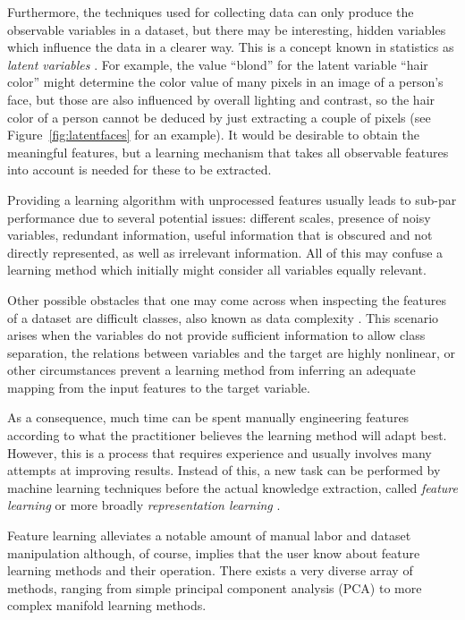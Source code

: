 Furthermore, the techniques used for collecting data can only produce the observable variables in a dataset, but there may be interesting, hidden variables which influence the data in a clearer way. This is a concept known in statistics as \textit{latent variables} . For example, the value  ``blond'' for the latent variable ``hair color'' might determine the color value of many pixels in an image of a person's face, but those are also influenced by overall lighting and contrast, so the hair color of a person cannot be deduced by just extracting a couple of pixels (see Figure~\ref{fig:latentfaces} for an example). It would be desirable to obtain the meaningful features, but a learning mechanism that takes all observable features into account is needed for these to be extracted.

Providing a learning algorithm with unprocessed features usually leads to sub-par performance due to several potential issues: different scales, presence of noisy variables, redundant information, useful information that is obscured and not directly represented, as well as irrelevant information. All of this may confuse a learning method which initially might consider all variables equally relevant.

Other possible obstacles that one may come across when inspecting the features of a dataset are difficult classes, also known as data complexity . This scenario arises when the variables do not provide sufficient information to allow class separation, the relations between variables and the target are highly nonlinear, or other circumstances prevent a learning method from inferring an adequate mapping from the input features to the target variable.

As a consequence, much time can be spent manually engineering features according to what the practitioner believes the learning method will adapt best. However, this is a process that requires experience and usually involves many attempts at improving results. Instead of this, a new task can be performed by machine learning techniques before the actual knowledge extraction, called \textit{feature learning} or more broadly \textit{representation learning} . 

Feature learning alleviates a notable amount of manual labor and dataset manipulation although, of course, implies that the user know about feature learning methods and their operation. There exists a very diverse array of methods, ranging from simple principal component analysis (PCA) to more complex manifold learning methods.

